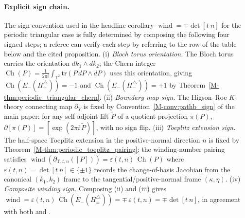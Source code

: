 \documentclass[11pt]{article}
\numberwithin{equation}{section}
\theoremstyle{definition}
\theoremstyle{remark}
\newcommand{\tr}{\mathrm{tr}}
\newcommand{\Ch}{\operatorname{Ch}}
\begin{document}
\paragraph{Explicit sign chain.}
The sign convention used in the headline corollary \(\operatorname{wind}=\mp\det[t\ n]\) for the
periodic triangular case is fully determined by composing the following four signed steps; a
referee can verify each step by referring to the row of the table below and the cited
proposition.
(i) \emph{Bloch torus orientation.} The Bloch torus carries the orientation
\(dk_1\wedge dk_2\); the Chern integer
\(\Ch(P)=\frac{1}{2\pi i}\int_{\mathbb T^2}\tr(P\,dP\wedge dP)\) uses this orientation, giving
\(\Ch(E_-(H_+^\triangle))=-1\) and \(\Ch(E_-(H_-^\triangle))=+1\) by
Theorem~\ref{M-thm:periodic_triangular_chern}.
(ii) \emph{Boundary map sign.} The Higson--Roe \(K\)-theory connecting map \(\partial_Y\) is
fixed by Convention~\ref{M-conv:pathb_sign} of the main paper: for any self-adjoint lift
\(\tilde P\) of a quotient projection \(\pi(P)\),
\(\partial[\pi(P)]=[\exp(2\pi i\,\tilde P)]\), with no sign flip.
(iii) \emph{Toeplitz extension sign.} The half-space Toeplitz extension in the positive-normal
direction \(n\) is fixed by Theorem~\ref{M-thm:periodic_toeplitz_pairing}: the winding-number
pairing satisfies \(\operatorname{wind}(\partial_{\mathrm T,t,n}([P]))=\varepsilon(t,n)\,\Ch(P)\)
where \(\varepsilon(t,n)=\det[t\ n]\in\{\pm 1\}\) records the change-of-basis Jacobian from the
canonical \((k_1,k_2)\) frame to the tangential/positive-normal frame \((\kappa,\eta)\).
(iv) \emph{Composite winding sign.} Composing (ii) and (iii) gives
\(\operatorname{wind}=\varepsilon(t,n)\,\Ch(E_-(H_\pm^\triangle))=\mp\,\varepsilon(t,n)
=\mp\det[t\ n]\), in agreement with both
 and .
\end{document}
